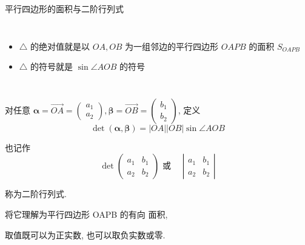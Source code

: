 \documentclass[10pt,punct]{ctexbeamer}
\begin{document}
\begin{frame}{平行四边形的面积与二阶行列式}
\begin{columns}[c]
        \pause
        \begin{itemize}
            \item  $\triangle$ 的\alert{绝对值}就是以 $O A, O B$ 为一组邻边的平行四边形 $O A P B$ 的面积 $S_{O A P B}$
            \item   $\triangle$ 的\alert{符号}就是 $\sin \angle A O B$ 的符号
        \end{itemize}


    \end{columns}



\end{frame}

\begin{frame}


    对任意 $\boldsymbol{\alpha}=\overrightarrow{O A}=\left(\begin{array}{l}a_1 \\ a_2\end{array}\right), \boldsymbol{\beta}= \overrightarrow{O B}=\left(\begin{array}{l}b_1 \\ b_2\end{array}\right)$, 定义 $$\operatorname{det}(\boldsymbol{\alpha}, \boldsymbol{\beta})=|O A||O B| \sin \angle A O B$$

    也记作
    $$\operatorname{det}\left(\begin{array}{ll}a_1 & b_1 \\ a_2 & b_2\end{array}\right) \mbox{ 或  } \quad \left|\begin{array}{ll}a_1 & b_1 \\ a_2 & b_2\end{array}\right|$$


    称为\alert{二阶行列式}.

    将它理解为平行四边形 OAPB 的\alert{有向 面积},

    取值既可以为正实数, 也可以取负实数或零.
\end{frame}
\end{document}

